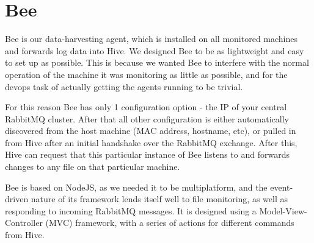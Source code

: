 \section{Bee}

Bee is our data-harvesting agent, which is installed on all monitored machines
and forwards log data into Hive. We designed Bee to be as lightweight and easy
to set up as possible. This is because we wanted Bee to interfere with the
normal operation of the machine it was monitoring as little as possible, and
for the devops task of actually getting the agents running to be trivial.

For this reason Bee has only 1 configuration option - the IP of your central
RabbitMQ cluster. After that all other configuration is either automatically
discovered from the host machine (MAC address, hostname, etc), or pulled in
from Hive after an initial handshake over the RabbitMQ exchange. After this,
Hive can request that this particular instance of Bee listens to and
forwards changes to any file on that particular machine.

Bee is based on NodeJS\cite{node}, as we needed it to be multiplatform, and the
event-driven nature of its framework lends itself well to file monitoring,
as well as responding to incoming RabbitMQ messages. It is designed using
a Model-View-Controller (MVC) framework, with a series of actions for
different commands from Hive.
